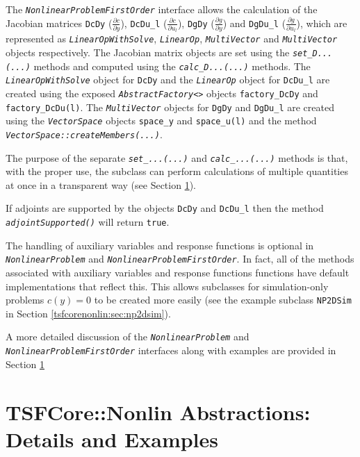 The \texttt{\textit{Nonlinear\-Problem\-First\-Order}} interface allows
the calculation of the Jacobian matrices \texttt{DcDy}
($\frac{\partial c}{\partial y}$), \texttt{DcDu\_l} ($\frac{\partial
c}{\partial u_l}$), \texttt{DgDy} ($\frac{\partial g}{\partial y}$)
and \texttt{DgDu\_l} ($\frac{\partial g}{\partial u_l}$), which are
represented as \texttt{\textit{Linear\-Op\-With\-Solve}},
\texttt{\textit{LinearOp}}, \texttt{\textit{MultiVector}}
and \texttt{\textit{MultiVector}} objects respectively.  The Jacobian
matrix objects are set using the
\texttt{\textit{set\_D\-...(...)}} methods and computed using the
\texttt{\textit{calc\_D\-...(...)}} methods.  The \texttt{\textit{Linear\-Op\-With\-Solve}}
object for \texttt{DcDy} and the \texttt{\textit{LinearOp}} object for
\texttt{DcDu\_l} are created using the exposed
\texttt{\textit{AbstractFactory<>}} objects \texttt{factory\_DcDy} and
\texttt{factory\_DcDu(l)}.  The \texttt{\textit{MultiVector}} objects
for \texttt{DgDy} and \texttt{DgDu\_l} are created using the
\texttt{\textit{VectorSpace}} objects \texttt{space\_y} and \texttt{space\_u(l)}
and the method \texttt{\textit{Vector\-Space\-::create\-Members(...)}}.

The purpose of the separate \texttt{\textit{set\_...(...)}} and
\texttt{\textit{calc\_...(...)}} methods is that, with the proper use,
the subclass can perform calculations of multiple quantities at once
in a transparent way (see Section \ref{tsfcorenonlin:sec:TSFCoreNonlin_Details}).

If adjoints are supported by the objects \texttt{DcDy} and
\texttt{DcDu\_l} then the method \texttt{\textit{adjoint\-Supported()}}
will return \texttt{true}.

The handling of auxiliary variables and response functions is optional
in \texttt{\textit{Nonlinear\-Problem}} and
\texttt{\textit{Nonlinear\-Problem\-First\-Order}}.  In fact, all of the
methods associated with auxiliary variables and response functions
functions have default implementations that reflect this.  This allows
subclasses for simulation-only problems $c(y) = 0$ to be created more
easily (see the example subclass \texttt{NP2DSim} in Section 
\ref{tsfcorenonlin:sec:np2dsim}).

A more detailed discussion of the \texttt{\textit{Nonlinear\-Problem}} and
\texttt{\textit{Nonlinear\-Problem\-First\-Order}} interfaces along with
examples are provided in Section \ref{tsfcorenonlin:sec:TSFCoreNonlin_Details}

%
\section{TSFCore::Nonlin Abstractions: Details and Examples}
\label{tsfcorenonlin:sec:TSFCoreNonlin_Details}
%

